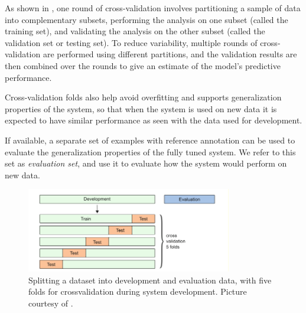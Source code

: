 As shown in , one round of cross-validation involves partitioning a sample of data into complementary subsets, performing the analysis on one subset (called the training set), and validating the analysis on the other subset (called the validation set or testing set). To reduce variability, multiple rounds of cross-validation are performed using different partitions, and the validation results are then combined over the rounds to give an estimate of the model’s predictive performance. 


Cross-validation folds also help avoid overfitting and supports generalization properties of the system, so that when the
system is used on new data it is expected to have similar performance as seen with the data used for development.

If available, a separate set of examples with reference annotation can be used to evaluate the generalization properties of the fully tuned system. We refer to this set as \textit{evaluation set}, and use it to evaluate how the system would perform on new data.

\begin{figure}[h]
	\centering
	\includegraphics[width=0.8\textwidth]{img/cross-valid}
	\caption[Cross-Validation Splitting]{Splitting a dataset into development and evaluation data, with five folds for crossvalidation during system development. Picture courtesy of \cite{virtanen2018computational}.}
	\label{fig:cross-valid}
\end{figure}

\newpage
